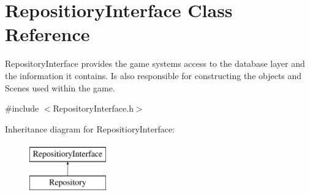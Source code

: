 \hypertarget{class_repositiory_interface}{}\section{Repositiory\+Interface Class Reference}
\label{class_repositiory_interface}


Repository\+Interface provides the game systems access to the database layer and the information it contains. Is also responsible for constructing the objects and Scenes used within the game.  




{\ttfamily \#include $<$Repository\+Interface.\+h$>$}

Inheritance diagram for Repositiory\+Interface\+:\begin{figure}[H]
\begin{center}
\leavevmode
\includegraphics[height=2.000000cm]{de/daa/class_repositiory_interface}
\end{center}
\end{figure}
